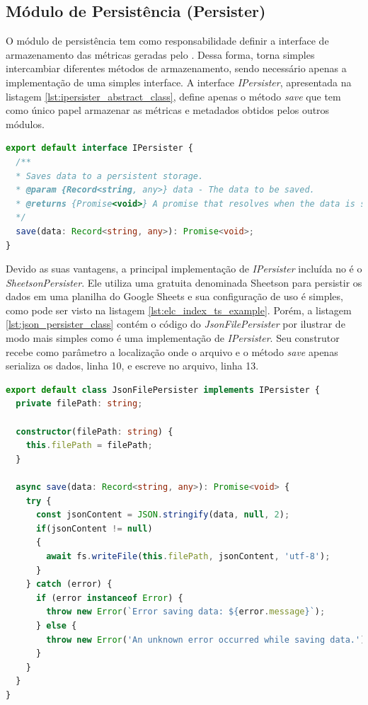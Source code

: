 \documentclass[12pt]{tcc}
\begin{document}
	\subsection{Módulo de Persistência (Persister)}
	\label{subsection:modulo-persister}

	O módulo de persistência tem como responsabilidade definir a interface de armazenamento das métricas geradas pelo .
	Dessa forma, torna simples intercambiar diferentes métodos de armazenamento, sendo necessário apenas a implementação de uma simples interface.
	A interface \emph{IPersister}, apresentada na listagem \ref{lst:ipersister_abstract_class}, define apenas o método \emph{save} que tem como único papel armazenar as métricas e metadados obtidos pelos outros módulos.

\begin{lstlisting}[label={lst:ipersister_abstract_class}, caption={Implementação da interface \emph{IPersister}.}, language=TypeScript, breaklines=true]
export default interface IPersister {
  /**
  * Saves data to a persistent storage.
  * @param {Record<string, any>} data - The data to be saved.
  * @returns {Promise<void>} A promise that resolves when the data is saved.
  */
  save(data: Record<string, any>): Promise<void>;
}
\end{lstlisting}

	Devido as suas vantagens, a principal implementação de \emph{IPersister} incluída no  é o \emph{SheetsonPersister}.
	Ele utiliza uma  gratuita denominada Sheetson para persistir os dados em uma planilha do Google Sheets e sua configuração de uso é simples, como pode ser visto na listagem \ref{lst:elc_index_ts_example}.
	Porém, a listagem \ref{lst:json_persister_class} contém o código do \emph{JsonFilePersister} por ilustrar de modo mais simples como é uma implementação de \emph{IPersister}.
	Seu construtor recebe como parâmetro a localização onde o arquivo  e o método \emph{save} apenas serializa os dados, linha 10, e escreve no arquivo, linha 13.


\begin{minipage}{\linewidth}
\begin{lstlisting}[label={lst:json_persister_class}, caption={Fragmento de código da classe \emph{JsonFilePersister} o qual implementa a camada de persistência para armazenar os resultado em um arquivo \acr{JSON}.}, language=TypeScript, breaklines=true]
export default class JsonFilePersister implements IPersister {
  private filePath: string;

  constructor(filePath: string) {
    this.filePath = filePath;
  }

  async save(data: Record<string, any>): Promise<void> {
    try {
      const jsonContent = JSON.stringify(data, null, 2);
      if(jsonContent != null)
      {
        await fs.writeFile(this.filePath, jsonContent, 'utf-8');
      }
    } catch (error) {
      if (error instanceof Error) {
        throw new Error(`Error saving data: ${error.message}`);
      } else {
        throw new Error('An unknown error occurred while saving data.');
      }
    }
  }
}
\end{lstlisting}
\end{minipage}
\end{document}

